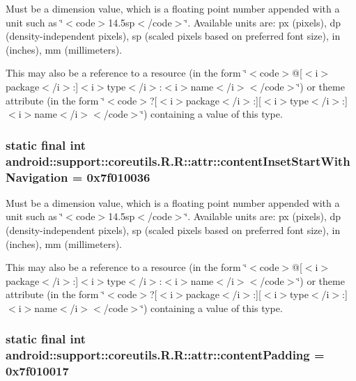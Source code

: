 Must be a dimension value, which is a floating point number appended with a unit such as \char`\"{}$<$code$>$14.5sp$<$/code$>$\char`\"{}. Available units are: px (pixels), dp (density-independent pixels), sp (scaled pixels based on preferred font size), in (inches), mm (millimeters). 

This may also be a reference to a resource (in the form \char`\"{}$<$code$>$@\mbox{[}$<$i$>$package$<$/i$>$:\mbox{]}$<$i$>$type$<$/i$>$:$<$i$>$name$<$/i$>$$<$/code$>$\char`\"{}) or theme attribute (in the form \char`\"{}$<$code$>$?\mbox{[}$<$i$>$package$<$/i$>$:\mbox{]}\mbox{[}$<$i$>$type$<$/i$>$:\mbox{]}$<$i$>$name$<$/i$>$$<$/code$>$\char`\"{}) containing a value of this type. \hypertarget{classandroid_1_1support_1_1coreutils_1_1_r_1_1attr_abc356da4626c5f9093960424a737fdc}{
\subsubsection[{contentInsetStartWithNavigation}]{\setlength{\rightskip}{0pt plus 5cm}static final int android::support::coreutils.R.R::attr::contentInsetStartWithNavigation = 0x7f010036}}
\label{classandroid_1_1support_1_1coreutils_1_1_r_1_1attr_abc356da4626c5f9093960424a737fdc}


Must be a dimension value, which is a floating point number appended with a unit such as \char`\"{}$<$code$>$14.5sp$<$/code$>$\char`\"{}. Available units are: px (pixels), dp (density-independent pixels), sp (scaled pixels based on preferred font size), in (inches), mm (millimeters). 

This may also be a reference to a resource (in the form \char`\"{}$<$code$>$@\mbox{[}$<$i$>$package$<$/i$>$:\mbox{]}$<$i$>$type$<$/i$>$:$<$i$>$name$<$/i$>$$<$/code$>$\char`\"{}) or theme attribute (in the form \char`\"{}$<$code$>$?\mbox{[}$<$i$>$package$<$/i$>$:\mbox{]}\mbox{[}$<$i$>$type$<$/i$>$:\mbox{]}$<$i$>$name$<$/i$>$$<$/code$>$\char`\"{}) containing a value of this type. \hypertarget{classandroid_1_1support_1_1coreutils_1_1_r_1_1attr_adf9f3e8077fec93127c551f05f15a4b}{
\subsubsection[{contentPadding}]{\setlength{\rightskip}{0pt plus 5cm}static final int android::support::coreutils.R.R::attr::contentPadding = 0x7f010017}}
\label{classandroid_1_1support_1_1coreutils_1_1_r_1_1attr_adf9f3e8077fec93127c551f05f15a4b}


